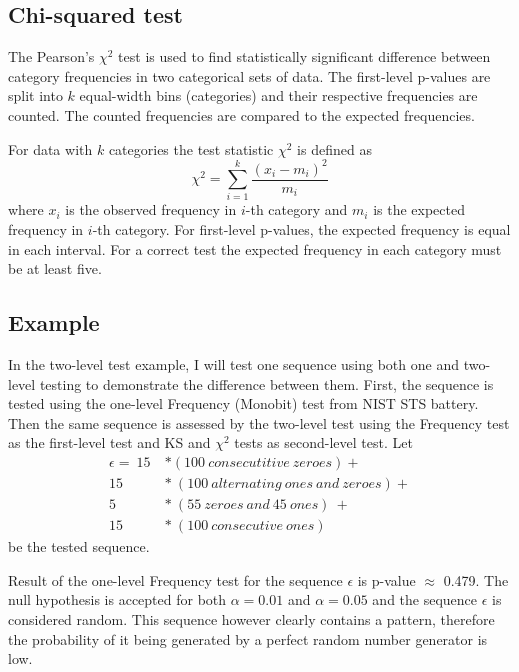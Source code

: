 \documentclass[
  digital,     %
  oneside,     %
  nosansbold,  %
  nocolorbold, %
  nolof,         %
  nolot,         %
]{fithesis4}
\begin{document}
\subsection{Chi-squared test}

The Pearson's $\chi^2$ test is used to find statistically significant difference between category frequencies in two categorical sets of data. The first-level p-values are split into $k$ equal-width bins (categories) and their respective frequencies are counted. The counted frequencies are compared to the expected frequencies.

For data with $k$ categories the test statistic $\chi^2$ is defined as \[\chi^2 = \sum_{i=1}^{k} \dfrac{(x_i - m_i)^2}{m_i} \]
where $x_i$ is the observed frequency in $i$-th category and $m_i$ is the expected frequency in $i$-th category. For first-level p-values, the expected frequency is equal in each interval. For a correct test the expected frequency in each category must be at least five. \cite[p. 171]{stat-procedures}

\subsection{Example}

In the two-level test example, I will test one sequence using both one and two-level testing to demonstrate the difference between them. First, the sequence is tested using the one-level Frequency (Monobit) test from NIST STS battery.\cite[p. 2-2]{nist_special} Then the same sequence is assessed by the two-level test using the Frequency test as the first-level test and KS and $\chi^2$ tests as second-level test. Let
\[\begin{split}
    \epsilon =\:15\: &* (100\:consecutitive\:zeroes) + \\
    15\:&*\:(100\:alternating\:ones\:and\:zeroes) + \\
    5\:&*\:(55\:zeroes\:and\:45\:ones)\:+\:\\
    15\:&*\:(100\:consecutive\:ones)
\end{split}\]
be the tested sequence. 

Result of the one-level Frequency test for the sequence $\epsilon$ is p-value $\approx$ 0.479. The null hypothesis is accepted for both $\alpha = 0.01$ and $\alpha = 0.05$ and the sequence $\epsilon$ is considered random. This sequence however clearly contains a pattern, therefore the probability of it being generated by a perfect random number generator is low.
\end{document}

